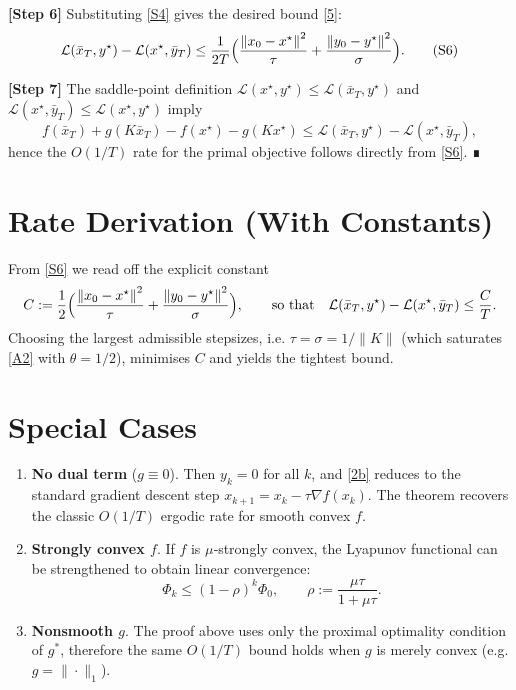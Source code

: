 \documentclass{article}
\newcommand{\norm}[1]{\left\lVert#1\right\rVert}
\begin{document}
\textbf{[Step 6]} Substituting \eqref{S4} gives the desired bound \eqref{5}:
\[
\mathcal L(\bar x_{T},y^{\star})-\mathcal L(x^{\star},\bar y_{T})
\le \frac{1}{2T}\Bigl(
\frac{\norm{x_{0}-x^{\star}}^{2}}{\tau}
+\frac{\norm{y_{0}-y^{\star}}^{2}}{\sigma}
\Bigr).
\tag{S6}
\]

\textbf{[Step 7]} The saddle‑point definition $\mathcal L(x^{\star},y^{\star})\le\mathcal L(\bar x_{T},y^{\star})$ and $\mathcal L(x^{\star},\bar y_{T})\le\mathcal L(x^{\star},y^{\star})$ imply
\[
f(\bar x_{T})+g(K\bar x_{T})-f(x^{\star})-g(Kx^{\star})
\le \mathcal L(\bar x_{T},y^{\star})-\mathcal L(x^{\star},\bar y_{T}),
\]
hence the $O(1/T)$ rate for the primal objective follows directly from \eqref{S6}. ∎

\section*{Rate Derivation (With Constants)}
From \eqref{S6} we read off the explicit constant
\[
C:=\frac12\Bigl(\frac{\norm{x_{0}-x^{\star}}^{2}}{\tau}
+\frac{\norm{y_{0}-y^{\star}}^{2}}{\sigma}\Bigr),
\qquad
\text{so that}\quad
\mathcal L(\bar x_{T},y^{\star})-\mathcal L(x^{\star},\bar y_{T})\le \frac{C}{T}.
\]
Choosing the largest admissible stepsizes, i.e. $\tau=\sigma=1/\|K\|$ (which saturates \eqref{A2} with $\theta=1/2$), minimises $C$ and yields the tightest bound.

\section*{Special Cases}
\begin{enumerate}
\item \textbf{No dual term} ($g\equiv0$). Then $y_{k}=0$ for all $k$, and \eqref{2b} reduces to the standard gradient descent step $x_{k+1}=x_{k}-\tau\nabla f(x_{k})$. The theorem recovers the classic $O(1/T)$ ergodic rate for smooth convex $f$.
\item \textbf{Strongly convex $f$}. If $f$ is $\mu$‑strongly convex, the Lyapunov functional can be strengthened to obtain linear convergence:
\[
\Phi_{k}\le (1-\rho)^{k}\Phi_{0},
\qquad\rho:=\frac{\mu\tau}{1+\mu\tau}.
\]
\item \textbf{Nonsmooth $g$}. The proof above uses only the proximal optimality condition of $g^{*}$, therefore the same $O(1/T)$ bound holds when $g$ is merely convex (e.g. $g=\|\cdot\|_{1}$).
\end{enumerate}
\end{document}
